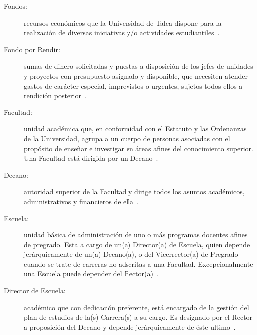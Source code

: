 \begin{glosario}
	\item 	\begin{description}
			    \item[Fondos:] recursos  económicos  que  la  Universidad  de  Talca  dispone  para  la  realización  de diversas iniciativas y/o actividades estudiantiles~\cite{1}.
			\end{description}

	\item 	\begin{description}
			    \item[Fondo por Rendir:] sumas de dinero solicitadas y puestas a disposición de los jefes de unidades y proyectos con presupuesto asignado y disponible, que necesiten atender gastos de carácter especial, imprevistos o urgentes, sujetos todos ellos a rendición posterior~\cite{1}.
			\end{description}

	\item 	\begin{description}
			    \item[Facultad:] unidad académica que, en conformidad con el Estatuto y las Ordenanzas de la Universidad, agrupa a un cuerpo de personas asociadas con el propósito de enseñar e investigar en áreas afines del conocimiento superior. Una Facultad está dirigida por un Decano~\cite{1}.
			\end{description}

	\item 	\begin{description}
			    \item[Decano:] autoridad superior de la Facultad y dirige todos los asuntos académicos, administrativos y financieros de ella~\cite{1}.
			\end{description}

	\item 	\begin{description}
			    \item[Escuela:] unidad básica de administración de uno o más programas docentes afines de pregrado. Esta a cargo de un(a) Director(a) de Escuela, quien depende jerárquicamente de un(a) Decano(a), o del Vicerrector(a) de Pregrado cuando se trate de carreras no adscritas a una Facultad. Excepcionalmente una Escuela puede depender del Rector(a)~\cite{1}.
			\end{description}

	\item 	\begin{description}
				\item[Director de Escuela:] académico que con dedicación preferente, está encargado de la gestión del plan de estudios de la(s) Carrera(s) a su cargo. Es designado por el Rector a proposición del Decano y depende jerárquicamente de éste ultimo~\cite{1}.			\end{description}


\end{glosario}
